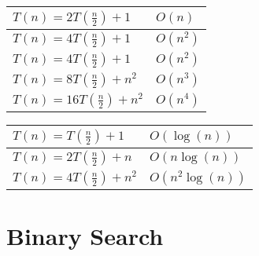 \documentclass[12pt]{article}
\begin{document}
\begin{center}
  \bgroup
  \def\arraystretch{1.5}%
  \begin{tabular}{ l | l  }
	$T(n) = 2T(\frac{n}{2}) + 1$
	&
	{ \Large  
	$O(n)$
	}
	\\ \hline
	$T(n) = 4T(\frac{n}{2}) + 1$
	&
	{ \Large  
	$O(n^{2})$
	}
	\\ \hline
	$T(n) = 4T(\frac{n}{2}) + 1$
	&
	{ \Large  
	$O(n^{2})$
	}
	\\ \hline
	$T(n) = 8T(\frac{n}{2}) + n^{2}$
	&
	{ \Large  
	$O(n^{3})$
	}
	\\ \hline
	$T(n) = 16 T(\frac{n}{2}) + n^{2}$
	&
	{ \Large  
	$O(n^{4})$
	}
	\\ 
  \end{tabular}
  \egroup
\end{center}







\begin{center}
  \bgroup
  \def\arraystretch{1.5}%
  \begin{tabular}{ l | l  }
	$T(n) = T(\frac{n}{2}) + 1$
	&
	{ \Large  
	$O(\log{(n)})$
	}
	\\ \hline
	$T(n) = 2T(\frac{n}{2}) + n$
	&
	{ \Large  
	$O(n\log{(n)})$
	}
	\\ \hline
	$T(n) = 4T(\frac{n}{2}) + n^{2}$
	&
	{ \Large  
	$O(n^{2}\log{(n)})$
	}
	\\
  \end{tabular}
  \egroup
\end{center}




\newpage


\section{Binary Search}
\end{document}
